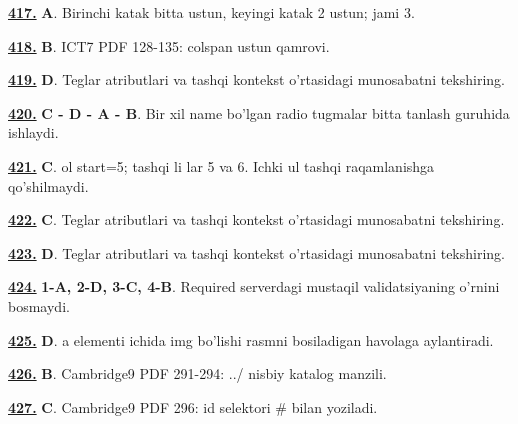 \documentclass[10pt,a4paper,oneside]{article}
\begin{document}
\noindent\hyperlink{q417}{\textbf{417.}} \textbf{A}.  Birinchi katak bitta ustun, keyingi katak 2 ustun; jami 3.
\par\vspace{3mm}
\noindent\hyperlink{q418}{\textbf{418.}} \textbf{B}.  ICT7 PDF 128-135: colspan ustun qamrovi.
\par\vspace{3mm}
\noindent\hyperlink{q419}{\textbf{419.}} \textbf{D}.  Teglar atributlari va tashqi kontekst o'rtasidagi munosabatni tekshiring.
\par\vspace{3mm}
\noindent\hyperlink{q420}{\textbf{420.}} \textbf{C - D - A - B}.  Bir xil name bo'lgan radio tugmalar bitta tanlash guruhida ishlaydi.
\par\vspace{3mm}
\noindent\hyperlink{q421}{\textbf{421.}} \textbf{C}.  ol start=5; tashqi li lar 5 va 6. Ichki ul tashqi raqamlanishga qo'shilmaydi.
\par\vspace{3mm}
\noindent\hyperlink{q422}{\textbf{422.}} \textbf{C}.  Teglar atributlari va tashqi kontekst o'rtasidagi munosabatni tekshiring.
\par\vspace{3mm}
\noindent\hyperlink{q423}{\textbf{423.}} \textbf{D}.  Teglar atributlari va tashqi kontekst o'rtasidagi munosabatni tekshiring.
\par\vspace{3mm}
\noindent\hyperlink{q424}{\textbf{424.}} \textbf{1-A, 2-D, 3-C, 4-B}.  Required serverdagi mustaqil validatsiyaning o'rnini bosmaydi.
\par\vspace{3mm}
\noindent\hyperlink{q425}{\textbf{425.}} \textbf{D}.  a elementi ichida img bo'lishi rasmni bosiladigan havolaga aylantiradi.
\par\vspace{3mm}
\noindent\hyperlink{q426}{\textbf{426.}} \textbf{B}.  Cambridge9 PDF 291-294: ../ nisbiy katalog manzili.
\par\vspace{3mm}
\noindent\hyperlink{q427}{\textbf{427.}} \textbf{C}.  Cambridge9 PDF 296: id selektori \# bilan yoziladi.
\par\vspace{3mm}
\end{document}
